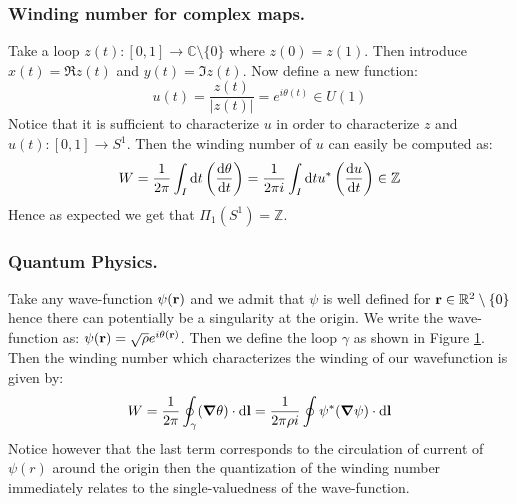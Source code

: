 \documentclass[10pt,a4paper]{book}
\begin{document}
\subsubsection{Winding number for complex maps.}
Take a loop $z(t) : [0, 1] \to \mathbb{C}\setminus\{0\}$ where $z(0) = z(1)$. Then introduce $x(t) = \Re z(t)$ and $y(t) = \Im z(t)$. Now define a new function:
\[
u(t) = \frac{z(t)}{|z(t)|} = e^{i \theta(t)} \in U(1)
\]
Notice that it is sufficient to characterize $u$ in order to characterize $z$ and $u(t) : [0, 1] \to S^1$. Then the winding number of $u$ can easily be computed as:
\[
W = \frac{1}{2\pi} \int_I \dd t \left( \dv{\theta}{t} \right) = \frac{1}{2\pi i } \int_I \dd t u^* \left(\dv{u}{t} \right) \in \mathbb{Z}
\]
Hence as expected we get that $\Pi_1(S^1) = \mathbb{Z}$.

\subsubsection{Quantum Physics.}
Take any wave-function $\psi(\vb{r})$ and we admit that $\psi$ is well defined for $\vb{r} \in \mathbb{R}^2 \setminus \{0\}$ hence there can potentially be a singularity at the origin. We write the wave-function as: $\psi(\vb{r}) = \sqrt{\rho} e^{i \theta(\vb{r})}$. Then we define the loop $\gamma$ as shown in Figure \ref{quant-gamma}. Then the winding number which characterizes the winding of our wavefunction is given by:
\[
W = \frac{1}{2\pi} \oint_\gamma (\grad \theta) \cdot \dd \vb{l} = \frac{1}{2\pi \rho i} \oint \psi^* (\grad \psi) \cdot \dd \vb{l}
\]
Notice however that the last term corresponds to the circulation of current of $\psi(r)$ around the origin then the quantization of the winding number immediately relates to the single-valuedness of the wave-function.

\begin{figure} \label{quant-gamma}
\centering
{}
\end{figure}
\end{document}
